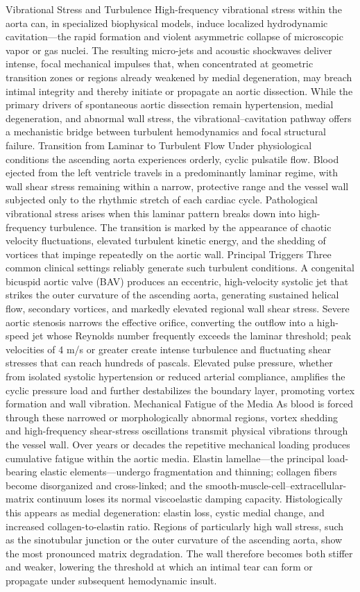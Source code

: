 Vibrational Stress and Turbulence
High-frequency vibrational stress within the aorta can, in specialized biophysical models, induce localized hydrodynamic cavitation—the rapid formation and violent asymmetric collapse of microscopic vapor or gas nuclei. The resulting micro-jets and acoustic shockwaves deliver intense, focal mechanical impulses that, when concentrated at geometric transition zones or regions already weakened by medial degeneration, may breach intimal integrity and thereby initiate or propagate an aortic dissection. While the primary drivers of spontaneous aortic dissection remain hypertension, medial degeneration, and abnormal wall stress, the vibrational–cavitation pathway offers a mechanistic bridge between turbulent hemodynamics and focal structural failure.
Transition from Laminar to Turbulent Flow
Under physiological conditions the ascending aorta experiences orderly, cyclic pulsatile flow. Blood ejected from the left ventricle travels in a predominantly laminar regime, with wall shear stress remaining within a narrow, protective range and the vessel wall subjected only to the rhythmic stretch of each cardiac cycle. Pathological vibrational stress arises when this laminar pattern breaks down into high-frequency turbulence. The transition is marked by the appearance of chaotic velocity fluctuations, elevated turbulent kinetic energy, and the shedding of vortices that impinge repeatedly on the aortic wall.
Principal Triggers
Three common clinical settings reliably generate such turbulent conditions. A congenital bicuspid aortic valve (BAV) produces an eccentric, high-velocity systolic jet that strikes the outer curvature of the ascending aorta, generating sustained helical flow, secondary vortices, and markedly elevated regional wall shear stress. Severe aortic stenosis narrows the effective orifice, converting the outflow into a high-speed jet whose Reynolds number frequently exceeds the laminar threshold; peak velocities of 4 m/s or greater create intense turbulence and fluctuating shear stresses that can reach hundreds of pascals. Elevated pulse pressure, whether from isolated systolic hypertension or reduced arterial compliance, amplifies the cyclic pressure load and further destabilizes the boundary layer, promoting vortex formation and wall vibration.
Mechanical Fatigue of the Media
As blood is forced through these narrowed or morphologically abnormal regions, vortex shedding and high-frequency shear-stress oscillations transmit physical vibrations through the vessel wall. Over years or decades the repetitive mechanical loading produces cumulative fatigue within the aortic media. Elastin lamellae—the principal load-bearing elastic elements—undergo fragmentation and thinning; collagen fibers become disorganized and cross-linked; and the smooth-muscle-cell–extracellular-matrix continuum loses its normal viscoelastic damping capacity. Histologically this appears as medial degeneration: elastin loss, cystic medial change, and increased collagen-to-elastin ratio. Regions of particularly high wall stress, such as the sinotubular junction or the outer curvature of the ascending aorta, show the most pronounced matrix degradation. The wall therefore becomes both stiffer and weaker, lowering the threshold at which an intimal tear can form or propagate under subsequent hemodynamic insult.
